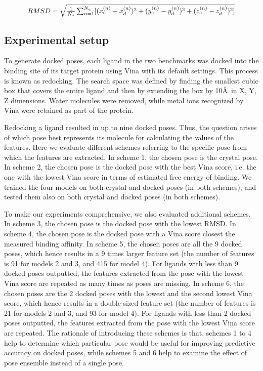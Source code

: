 \documentclass[twocolumn]{bmcart}
\begin{document}
\begin{equation}
\resizebox{.85\hsize}{!}{$RMSD = \sqrt{\frac{1}{N_a}\sum_{n=1}^{N_a}[(x_c^{(n)}-x_d^{(n)})^2+(y_c^{(n)}-y_d^{(n)})^2+(z_c^{(n)}-z_d^{(n)})^2]}$}
\label{rescoring2:rmsd}
\end{equation}

\subsection*{Experimental setup}

To generate docked poses, each ligand in the two benchmarks was docked into the binding site of its target protein using Vina with its default settings. This process is known as redocking. The search space was defined by finding the smallest cubic box that covers the entire ligand and then by extending the box by 10\AA\ in X, Y, Z dimensions. Water molecules were removed, while metal ions recognized by Vina were retained as part of the protein. 

Redocking a ligand resulted in up to nine docked poses. Thus, the question arises of which pose best represents its molecule for calculating the values of the features. Here we evaluate different schemes referring to the specific pose from which the features are extracted. In scheme 1, the chosen pose is the crystal pose. In scheme 2, the chosen pose is the docked pose with the best Vina score, i.e. the one with the lowest Vina score in terms of estimated free energy of binding. We trained the four models on both crystal and docked poses (in both schemes), and tested them also on both crystal and docked poses (in both schemes).

To make our experiments comprehensive, we also evaluated additional schemes. In scheme 3, the chosen pose is the docked pose with the lowest RMSD. In scheme 4, the chosen pose is the docked pose with a Vina score closest the measured binding affinity. In scheme 5, the chosen poses are all the 9 docked poses, which hence results in a 9 times larger feature set (the number of features is 91 for models 2 and 3, and 415 for model 4). For ligands with less than 9 docked poses outputted, the features extracted from the pose with the lowest Vina score are repeated as many times as poses are missing. In scheme 6, the chosen poses are the 2 docked poses with the lowest and the second lowest Vina score, which hence results in a double-sized feature set (the number of features is 21 for models 2 and 3, and 93 for model 4). For ligands with less than 2 docked poses outputted, the features extracted from the pose with the lowest Vina score are repeated. The rationale of introducing these schemes is that, schemes 1 to 4 help to determine which particular pose would be useful for improving predictive accuracy on docked poses, while schemes 5 and 6 help to examine the effect of pose ensemble instead of a single pose.
\end{document}
